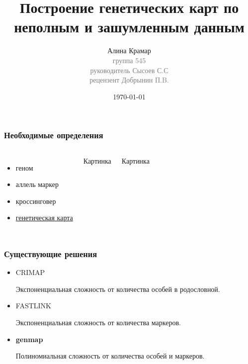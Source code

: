 \documentclass{beamer}
\title{Построение генетических карт по неполным и
зашумленным данным}
\author{Алина Крамар\\
  { \footnotesize \textcolor{gray}{группа 545\\ руководитель Сысоев
      С.С\\ рецензент Добрынин П.B.}}}
\institute{Санкт-Петербургский государственный университет}
\date{\today}
\begin{document}
\newcommand{\genmap}{\textbf{genmap}}

\begin{frame}
\titlepage
\end{frame}

\begin{frame}
  \frametitle{Необходимые определения}
  \begin{columns}
    \begin{itemize}
    \item геном
    \item аллель маркер
    \item кроссинговер
    \item \underline{генетическая карта}
    \end{itemize}

    Картинка

    \medskip

    Картинка
  \end{columns}

\end{frame}

\begin{frame}
  \frametitle{Существующие решения}
  \begin{itemize}
  \item CRIMAP

    Экспоненциальная сложность от количества особей в родословной.
  \item FASTLINK

    Экспоненциальная сложность от количества маркеров.
  \item \genmap

    Полиномиальная сложность от количества особей и маркеров.
  \end{itemize}
\end{frame}
\end{document}
